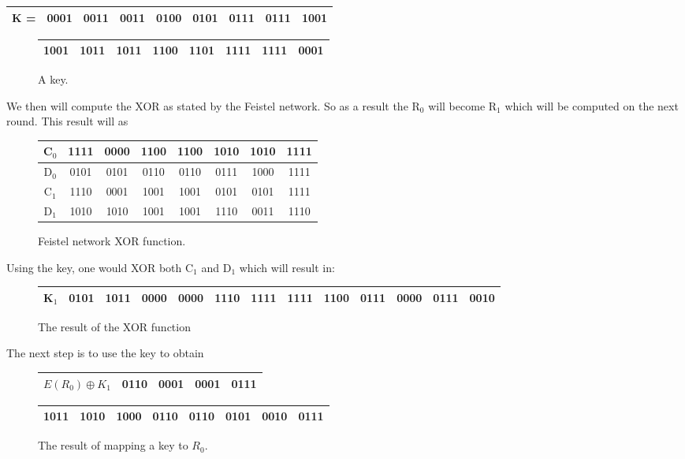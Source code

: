 \documentclass[11pt,a4paper, notitlepage]{report}
\begin{document}
\begin{tabular}{|c|c|c|c|c|c|c|c|c|} \hline
K = & 0001 & 0011 & 0011 & 0100 & 0101 & 0111 & 0111 & 1001
\\ \hline
\end{tabular}
\begin{figure}[H]
\centering
\label{tab:KeyExample}
\begin{tabular}{|c|c|c|c|c|c|c|c|} \hline
1001 & 1011 & 1011 & 1100 & 1101 & 1111 & 1111 & 0001\\ \hline
\end{tabular}
\caption{A key.}
\end{figure}
We then will compute the XOR as stated by the Feistel network. So as a result the R$_{0}$ will become R$_{1}$ which will be computed on the next round.
This result will as


\begin{figure}[H]
\centering
\label{tab:XORFN}
\begin{tabular}{|c|c|c|c|c|c|c|c|} \hline
C$_{0}$ & 1111 & 0000 & 1100 & 1100 & 1010 & 1010 & 1111\\ \hline
D$_{0}$ & 0101 & 0101 & 0110 & 0110 & 0111 & 1000 & 1111\\ \hline
C$_{1}$ & 1110 & 0001 & 1001 & 1001 & 0101 & 0101 & 1111\\ \hline
D$_{1}$ & 1010 & 1010 & 1001 & 1001 & 1110 & 0011 & 1110\\ \hline
\end{tabular}
\caption{Feistel network XOR function.}
\end{figure}

Using the key, one would XOR both C$_{1}$ and D$_{1}$ which will result in:


\begin{figure}[H]
\centering
\label{tab:Roundmapping}
\begin{tabular}{|c|c|c|c|c|c|c|c|c|c|c|c|c|}\hline
K$_{1}$ & 0101 & 1011 & 0000 & 0000 & 1110 & 1111 & 1111 & 1100 & 0111 & 0000 & 0111 & 0010\\ \hline
\end{tabular}
\caption{The result of the XOR function }
\end{figure}

The next step is to use the key to obtain

\begin{figure}[H]
\label{tab:XORR0K}
\begin{tabular}{|c|c|c|c|c|}\hline
$E(R_{0}) \oplus K_{1}$ & 0110 & 0001 & 0001 & 0111\\ \hline
\end{tabular}

\indent \begin{tabular}{|c|c|c|c|c|c|c|c|}\hline
1011 & 1010 & 1000 & 0110 & 0110 & 0101 & 0010 & 0111\\ \hline
\end{tabular}
\caption{The result of mapping a key to $R_{0}$.}
\end{figure}
\end{document}
